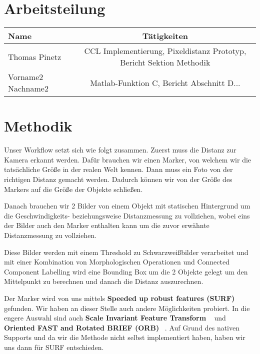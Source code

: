\documentclass[deutsch]{scrartcl}
\begin{document}
\section{Arbeitsteilung}

\begin{center}
	\begin{tabular}{ |l | c | }
		\hline
		Name & Tätigkeiten\\
		\hline
		Thomas Pinetz & CCL Implementierung, Pixeldistanz Prototyp, Bericht Sektion Methodik \\
		\hline
		Vorname2 Nachname2 & Matlab-Funktion C, Bericht Abschnitt D...\\
		\hline
	\end{tabular}
\end{center}


\section{Methodik}

Unser Workflow setzt sich wie folgt zusammen. Zuerst muss die Distanz zur Kamera erkannt werden. Dafür brauchen wir einen Marker, von welchem wir die tatsächliche Größe in der realen Welt kennen. Dann muss ein Foto von der richtigen Distanz gemacht werden. Dadurch können wir von der Größe des Markers auf die Größe der Objekte schließen. 

Danach brauchen wir 2 Bilder von einem Objekt mit statischen Hintergrund um die Geschwindigkeits- beziehungsweise Distanzmessung zu vollziehen, wobei eins der Bilder auch den Marker enthalten kann um die zuvor erwähnte Distanzmessung zu vollziehen.

Diese Bilder werden mit einem Threshold zu Schwarzweißbilder verarbeitet und mit einer Kombination von Morphologischen Operationen und Connected Component Labelling wird eine Bounding Box um die 2 Objekte gelegt um den Mittelpunkt zu berechnen und danach die Distanz auszurechnen.

Der Marker wird von uns mittels \textbf{Speeded up robust features (SURF)} ~\cite{bay2006surf} gefunden. Wir haben an dieser Stelle auch andere Möglichkeiten probiert. In die engere Auswahl sind auch \textbf{Scale Invariant Feature Transform} ~\cite{lowe2004distinctive} und \textbf{Oriented FAST and Rotated BRIEF (ORB)} ~\cite{rublee2011orb}. Auf Grund des nativen Supports und da wir die Methode nicht selbst implementiert haben, haben wir uns dann für SURF entschieden. 
\end{document}
